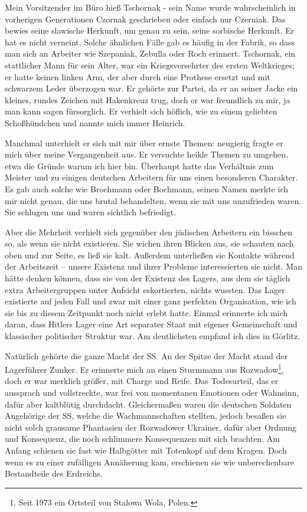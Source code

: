 Mein Vorsitzender im Büro hieß Tschornak - sein Name wurde wahrscheinlich in vorherigen Generationen Czornak geschrieben oder einfach nur Czerniak. 
Das bewies seine slawische Herkunft, um genau zu sein, seine sorbische Herkunft. Er hat es nicht verneint. Solche ähnlichen Fälle gab es häufig in der Fabrik, so dass man sich an Arbeiter wie Szepaniak, Zebulla oder Roch erinnert. Tschornak, ein stattlicher Mann für sein Alter, war ein Kriegsversehrter des ersten Weltkrieges; er hatte keinen linken Arm, der aber durch eine Prothese ersetzt und mit schwarzem Leder überzogen war.
Er gehörte zur Partei, da er an seiner Jacke ein kleines, rundes Zeichen mit Hakenkreuz trug, doch er war freundlich zu mir, ja man kann sagen fürsorglich. 
Er verhielt sich höflich, wie zu einem geliebten Schoßhündchen und nannte mich immer \glqq Heinrich\grqq.

Manchmal unterhielt er sich mit mir über ernste Themen: neugierig fragte er mich  über meine Vergangenheit aus. Er versuchte heikle Themen zu umgehen, etwa die Gründe warum ich hier bin. Überhaupt hatte das Verhältnis zum Meister und zu einigen deutschen Arbeitern  für uns einen besonderen Charakter. Es gab auch solche wie Brochmann oder Bochmann, seinen Namen merkte ich mir nicht genau, die uns brutal behandelten, wenn sie mit uns unzufrieden waren. Sie schlugen uns und waren sichtlich befriedigt.

Aber die Mehrheit verhielt sich gegenüber den jüdischen Arbeitern ein bisschen so, als wenn sie nicht existieren. Sie wichen ihren Blicken aus, sie schauten nach oben und zur Seite, es ließ sie kalt. Außerdem unterließen sie Kontakte während der Arbeitszeit -- unsere Existenz und ihrer Probleme interessierten sie nicht. 
Man hätte denken können, dass sie von der Existenz des Lagers, aus dem sie täglich extra Arbeitergruppen unter Aufsicht eskortierten, nichts wussten. Das Lager existierte auf jeden Fall und zwar mit einer ganz perfekten Organisation, wie ich sie bis zu diesem Zeitpunkt noch nicht erlebt hatte. Einmal erinnerte ich mich daran, dass Hitlers Lager eine Art separater Staat mit eigener Gemeinschaft und klassischer politischer Struktur war. Am deutlichsten empfand ich dies in Görlitz.

Natürlich gehörte die ganze Macht der SS. An der Spitze der Macht stand der Lagerführer Zunker. Er erinnerte mich an einen Sturmmann aus Rozwadow\footnote{Seit 1973 ein Ortsteil von Stalowa Wola, Polen.}, doch er war merklich größer, mit Charge und Reife. Das Todesurteil, das er aussprach und vollstreckte, war frei von momentanen Emotionen oder Wahnsinn, dafür aber kaltblütig durchdacht. Gleichermaßen waren die deutschen Soldaten Angehörige der SS, welche die Wachmannschaften stellten, jedoch besaßen sie nicht solch grausame Phantasien der Rozwadower Ukrainer, dafür aber Ordnung und Konsequenz, die noch schlimmere Konsequenzen mit sich brachten. Am Anfang schienen sie fast wie Halbgötter mit Totenkopf auf dem Kragen. Doch wenn es zu einer zufälligen Annäherung kam, erschienen sie wie unberechenbare Bestandteile des Erdreichs. %

